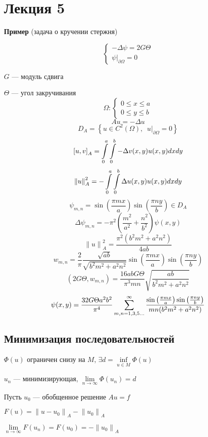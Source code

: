 \section{Лекция 5}

\textbf{Пример} (задача о кручении стержня)

\[ \left\{ \begin{array}{l}
	-\Delta \psi = 2 G \Theta  \\
	\left. \psi \right|_{\partial\Omega} = 0  
\end{array} \right. \]

$G$ --- модуль сдвига

$\Theta$ --- угол закручивания
\[ \Omega: \left\{ \begin{array}{l}
	0 \leq x \leq a  \\
	0 \leq y \leq b  
\end{array} \right. \]
\[ Au = -\Delta u \]
\[ D_A = \left\{ u \in C^2(\Omega), \enspace \left. u \right|_{\partial \Omega} = 0 \right\} \]
\[ {[u,v]}_A = \int\limits_{0}^{a} \int\limits_{0}^{b} -\Delta v(x,y)u(x,y)dxdy \]
\[ {\| u \|}^2_A = - \int\limits_{0}^{a} \int\limits_{0}^{b} \Delta u(x,y)u(x,y)dxdy \]
\[ \psi_{m,n} = \sin \left( \frac{\pi m x}{a} \right) \sin \left( \frac{\pi n y}{b} \right) \in D_A \]
\[ \Delta \psi_{m,n} = - \pi^2 \left( \frac{m^2}{a^2} + \frac{n^2}{b^2} \right) \psi (x, y) \]
\[ {\| u \|}^2_A = \frac{\pi^2 (b^2 m^2 + a^2 n^2)}{4ab} \]
\[ w_{m,n} = \frac{2}{\pi} \frac{\sqrt{ab}}{\sqrt{b^2 m^2 + a^2 n^2}} \sin \left( \frac{\pi m x}{a} \right) \sin \left( \frac{\pi n y}{b} \right) \]
\[ (2G\Theta, w_{m,n}) = \frac{16abG\Theta}{\pi^3 m n} \sqrt{\frac{ab}{b^2 m^2 + a^2 n^2}} \]
\[ \psi(x,y) = \frac{32G\Theta a^2b^2}{\pi^4} \sum\limits_{m,n=1,3,5...}^{\infty} \frac{\sin \left( \frac{\pi m x}{a} \right) \sin \left( \frac{\pi n y}{b} \right)}{mn (b^2 m^2 + a^2 n^2)} \]

\subsection{Минимизация последовательностей}

$ \Phi(u) $ ограничен снизу на $M$, \quad $\exists d = \underset{u \in M}{\inf} \Phi(u)$

$ {u_n}$ --- минимизирующая, \quad $ \underset{n \rightarrow \infty}{\lim} \Phi(u_n) = d $

Пусть $u_0$ --- обобщенное решение $Au = f$

$ F(u) = {\| u - u_0 \|}_A - {\| u_0 \|}_A $

$ \underset{n \rightarrow \infty}{\lim} F(u_n) = F(u_0) = - {\| u_0 \|}_A $ \\

